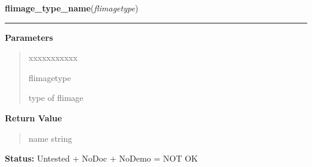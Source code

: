 \hspace{.8\funcindent}\begin{boxedminipage}{\funcwidth}

    \raggedright \textbf{flimage\_type\_name}(\textit{flimagetype})

    \vspace{-1.5ex}

    \rule{\textwidth}{0.5\fboxrule}
\setlength{\parskip}{2ex}
\setlength{\parskip}{1ex}
      \textbf{Parameters}
      \vspace{-1ex}

      \begin{quote}
        \begin{Ventry}{xxxxxxxxxxx}

          \item[flimagetype]

          type of flimage

        \end{Ventry}

      \end{quote}

      \textbf{Return Value}
    \vspace{-1ex}

      \begin{quote}
      name string

      \end{quote}

\textbf{Status:} Untested + NoDoc + NoDemo = NOT OK



    \end{boxedminipage}

    \label{xformslib:library:flimage_add_text}

    \vspace{0.5ex}

